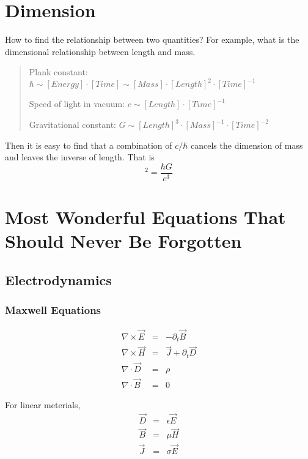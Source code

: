 









\section{Dimension}

How to find the relationship between two quantities? For example, what is the dimensional relationship between length and mass.
\begin{quotation}
Plank constant: $\hbar \sim [Energy]\cdot [Time] \sim [Mass]\cdot [Length]^2 \cdot [Time]^{-1}$ 

Speed of light in vacuum: $c\sim [Length]\cdot [Time]^{-1}$

Gravitational constant: $G \sim [Length]^3\cdot [Mass]^{-1} \cdot [Time]^{-2}$
\end{quotation}

Then it is easy to find that a combination of $c/\hbar$ cancels the dimension of mass and leaves the inverse of length. That is
\begin{equation}
[Length]^2 = \frac{\hbar G}{c^3}
\end{equation}



\section{Most Wonderful Equations That Should Never Be Forgotten}

\subsection{Electrodynamics}

\subsubsection{Maxwell Equations}
\begin{eqnarray}
\nabla\times\vec E&=&-\partial_t \vec B \\
\nabla\times\vec H&=&\vec J+\partial_t \vec D \\
\nabla\cdot \vec D&=&\rho \\
\nabla\cdot \vec B&=&0
\end{eqnarray}

For linear meterials, \begin{eqnarray}
\vec D&=&\epsilon \vec E \\
\vec B&=&\mu \vec H \\
\vec J&=& \sigma \vec E
\end{eqnarray}


